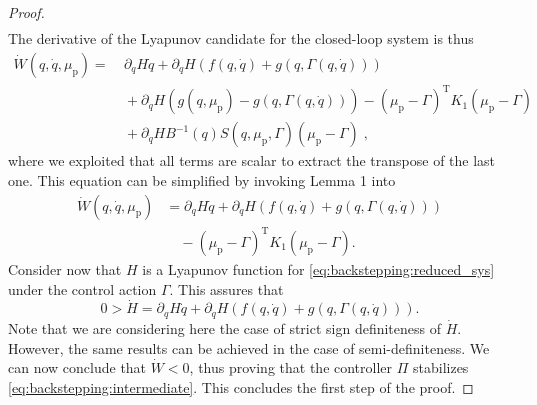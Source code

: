 \begin{proof}
\begin{equation*}
\begin{split}
		\end{split}
	\end{equation*}
	The derivative of the Lyapunov candidate for the closed-loop system is thus
	\begin{equation*}
	\begin{split}
	\dot{W}(q,\dot{q},\mu_\mathrm{p}) =& \: \partial_{q} H \dot{q} + \partial_{\dot{q}} H (f(q,\dot{q}) + g(q,\Gamma(q,\dot{q}))) \\
	&\: + \partial_{\dot{q}} H (g(q,\mu_\mathrm{p}) - g(q,\Gamma(q,\dot{q}))) - (\mu_\mathrm{p} - \Gamma)^{\mathrm{T}}K_1(\mu_\mathrm{p} - \Gamma) \\
	&\: +  \partial_{\dot{q}} H B^{-1}(q) S(q,\mu_\mathrm{p},\Gamma) (\mu_\mathrm{p} - \Gamma)\;,
	\end{split}
	\end{equation*}
	where we exploited that all terms are scalar to extract the transpose of the last one. This equation can be  simplified by invoking Lemma 1 into
	\begin{equation}
	\begin{split}
	\dot{W}(q,\dot{q},\mu_\mathrm{p}) &=  \partial_{q} H \dot{q} + \partial_{\dot{q}} H (f(q,\dot{q}) + g(q,\Gamma(q,\dot{q}))) \\
	&\quad - (\mu_\mathrm{p} - \Gamma)^{\mathrm{T}}K_1(\mu_\mathrm{p} - \Gamma).
	\end{split}
	\end{equation}
	Consider now that $H$ is a Lyapunov function for \eqref{eq:backstepping:reduced_sys} under the control action $\Gamma$. This assures that
	\begin{equation}
		0 > \dot{H} = \partial_{q} H \dot{q} + \partial_{\dot{q}} H (f(q,\dot{q}) + g(q,\Gamma(q,\dot{q}))).
	\end{equation}
	Note that we are considering here the case of strict sign definiteness of $\dot{H}$. However, the same results can be achieved in the case of semi\--definiteness.
	We can now conclude that $\dot{W} < 0$, thus proving that the controller $\Pi$ stabilizes \eqref{eq:backstepping:intermediate}. This concludes the first step of the proof.
	

\end{proof}
